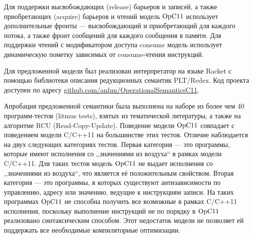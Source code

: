 Для поддержки высвобождающих (release) барьеров и записей, а также приобретающих (acquire) барьеров и чтений
модель $\mathrm{OpC11}$ использует дополнительные фронты --- высвобождающий и приобретающий для каждого потока,
а также фронт сообщений для каждого сообщения в памяти. Для поддержки чтений с модификатором доступа
consume модель использует динамическую пометку зависимых от consume-чтения инструкций.


Для предложенной модели был реализован интерпретатор на языке Racket с помощью библиотеки описания редукционных
семантик PLT/Redex. Код проекта доступен по адресу \url{github.com/anlun/OperationalSemanticsC11}.

Апробация предложенной семантики была выполнена на наборе из более чем 40 программ-тестов (litmus tests), взятых из  тематической литературы, а также 
на алгоритме RCU (Read-Copy-Update). Поведение модели $\mathrm{OpC11}$ совпадает с поведением модели C/C++11 на большинстве этих тестов.
Отличие наблюдается на двух следующих категориях тестов. Первая категория --- это программы, которые имеют исполнения со
,,значениями из воздуха`` в рамках модели C/C++11. Для таких тестов модель $\mathrm{OpC11}$ не выдает исполнения со ,,значениями из воздуха``,
что является её положительным свойством. Вторая категория --- это программы, в которых существуют антизависимости по управлению,
адресу или значению, ведущие к инструкциям записи. На таких программах $\mathrm{OpC11}$ не способна получить все возможные в рамках C/C++11
исполнения, поскольку выполнение инструкций не по порядку в $\mathrm{OpC11}$ реализовано синтаксическим способом. Этот недостаток модели не позволяет ей поддержать все необходимые компиляторные оптимизации.

